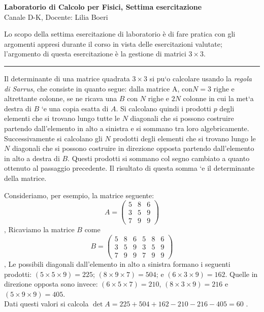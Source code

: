 \documentclass[11pt]{article}
\begin{document}
\pagestyle{empty}

\begin{center}
{\Large \bf  Laboratorio di Calcolo per Fisici, Settima esercitazione\\[2mm]}
{\large Canale D-K, Docente: Lilia Boeri}
\end{center}
\vspace{4mm}

\begin{mdframed}[backgroundcolor=gray!10]
  Lo scopo della settima esercitazione di laboratorio \`e di fare pratica con
gli argomenti appresi durante il corso in vista delle esercitazioni valutate;
l'argomento di questa esercitazione \`e la gestione di matrici $3 \times 3$.
  \end{mdframed}
%
%



\hrule
\vspace{2mm}
Il determinante di una matrice quadrata $3 \times 3$ si pu`o calcolare usando la {\em regola di Sarrus}, che consiste in quanto segue: dalla matrice A, con$ N \! = \!  3$ righe 
e altrettante colonne, se ne ricava una $B$ con $N$ righe e $2N$ colonne in
cui la met`a destra di $B$ `e una copia esatta di $A$. Si calcolano quindi i prodotti $p$ degli elementi che si trovano
lungo tutte le $N$ diagonali che si possono costruire partendo dall’elemento in alto a sinistra e si sommano tra loro
algebricamente. Successivamente si calcolano gli $N$ prodotti degli elementi che si trovano lungo le $N$ diagonali che
si possono costruire in direzione opposta partendo dall’elemento in alto a destra di $B$. Questi prodotti si sommano
col segno cambiato a quanto ottenuto al passaggio precedente. Il risultato di questa somma `e il determinante della
matrice.

Consideriamo, per esempio, la matrice seguente:
\[
A = \left(\begin{array}{ccc}
5 &8& 6\\
3 &5 &9\\
7 & 9 & 9
\end{array}
\right)
\]
‚
Ricaviamo la matrice $B$ come
\[
B = \left(\begin{array}{cccccc}
5 & 8 & 6 &5 & 8 & 6\\
3 & 5 & 9 &3 &5  &9\\
7 & 9 & 9 &7 &9 & 9
\end{array}
\right)
\]
‚
Le possibili diagonali dall’elemento in alto a sinistra formano i seguenti prodotti: $(5 \times 5 \times 9)= 225$;
$(8 \times 9 \times 7)= 504$; 
e $(6\times3\times9)=162$. Quelle in direzione opposta sono invece: 
$(6\times5\times7)=210$, $(8\times3\times9)=216$ e $(5\times9\times9)=405$.
\\
Dati questi valori si calcola
$\det A = 225 + 504 +162 - 210 - 216 -405= 60$ .
\end{document}
